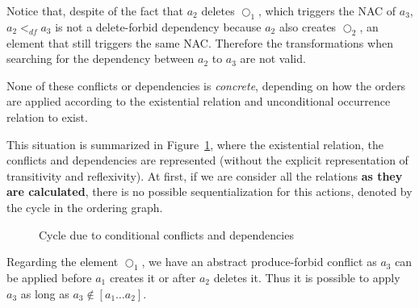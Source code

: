 \begin{example}
  Notice that, despite of the fact that $a_2$ deletes $\Circle_1$, which triggers the NAC of $a_3$, $a_2 <_{df} a_3$ is not a delete-forbid dependency because $a_2$ also creates $\Circle_2$, an element that still triggers the same NAC. Therefore the transformations when searching for the dependency between $a_2$ to $a_3$ are not valid.

  None of these conflicts or dependencies is \emph{concrete}, depending on how the orders are applied according to the existential relation and unconditional occurrence relation to exist.
  
  This situation is summarized in Figure~\ref{fig:process:order:cycle}, where the existential relation, the conflicts and dependencies are represented (without the explicit representation of transitivity and reflexivity). At first, if we are consider all the relations \textbf{as they are calculated}, there is no possible sequentialization for this actions, denoted by the cycle in the ordering graph.

\begin{figure}[!ht]
  \centering
  \caption{Cycle due to conditional conflicts and dependencies}\label{fig:process:order:cycle}
\end{figure}

  Regarding the element $\Circle_1$, we have an abstract produce-forbid conflict as $a_3$ can be applied before $a_1$ creates it or after $a_2$ deletes it. Thus it is possible to apply $a_3$ as long as $a_3 \not\in [a_1\ldots a_2]$. %


\end{example}
